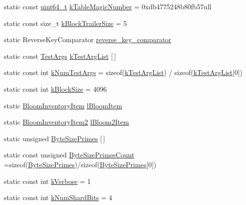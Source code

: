 \begin{DoxyCompactItemize}
\begin{tabbing}
\end{tabbing}\item 
static const \hyperlink{stdint_8h_aaa5d1cd013383c889537491c3cfd9aad}{uint64\+\_\+t} \hyperlink{namespaceleveldb_a4ea4fa6917989c12324b715f1b3069f8}{k\+Table\+Magic\+Number} = 0xdb4775248b80fb57ull
\item 
static const size\+\_\+t \hyperlink{namespaceleveldb_a4f00b102aae97cb0b0418b6f703a577e}{k\+Block\+Trailer\+Size} = 5
\item 
static Reverse\+Key\+Comparator \hyperlink{namespaceleveldb_a4f7cb0b6f4da1c10852632bfdb7dd227}{reverse\+\_\+key\+\_\+comparator}
\item 
static const \hyperlink{structleveldb_1_1_test_args}{Test\+Args} \hyperlink{namespaceleveldb_a6d7e1fb11fbc0e83ef27e87007c8a425}{k\+Test\+Arg\+List} \mbox{[}$\,$\mbox{]}
\item 
static const int \hyperlink{namespaceleveldb_a0bc857a7e9baff42f61503688957b6f5}{k\+Num\+Test\+Args} = sizeof(\hyperlink{namespaceleveldb_a6d7e1fb11fbc0e83ef27e87007c8a425}{k\+Test\+Arg\+List}) / sizeof(\hyperlink{namespaceleveldb_a6d7e1fb11fbc0e83ef27e87007c8a425}{k\+Test\+Arg\+List}\mbox{[}0\mbox{]})
\item 
static const int \hyperlink{namespaceleveldb_a6fb0b0eafa487f7c4940d210c77cece6}{k\+Block\+Size} = 4096
\item 
static \hyperlink{structleveldb_1_1_bloom_inventory_item}{Bloom\+Inventory\+Item} \hyperlink{namespaceleveldb_acc1fed1017077f7029ec84822fa65036}{l\+Bloom\+Item}
\item 
static \hyperlink{structleveldb_1_1_bloom_inventory_item2}{Bloom\+Inventory\+Item2} \hyperlink{namespaceleveldb_ae4321eb319595833c9930272feb5dde6}{l\+Bloom2\+Item}
\item 
static unsigned \hyperlink{namespaceleveldb_aba6f91cadb787d48e7534dfeaa5422be}{Byte\+Size\+Primes} \mbox{[}$\,$\mbox{]}
\item 
static const unsigned \hyperlink{namespaceleveldb_a718ea58cbfcecd6d7bddc94661756618}{Byte\+Size\+Primes\+Count} =sizeof(\hyperlink{namespaceleveldb_aba6f91cadb787d48e7534dfeaa5422be}{Byte\+Size\+Primes})/sizeof(\hyperlink{namespaceleveldb_aba6f91cadb787d48e7534dfeaa5422be}{Byte\+Size\+Primes}\mbox{[}0\mbox{]})
\item 
static const int \hyperlink{namespaceleveldb_af8897be0086c2db6e31344b7679c170a}{k\+Verbose} = 1
\item 
static const int \hyperlink{namespaceleveldb_ac3f66d6fb2271c29359e1cd233b1f8ca}{k\+Num\+Shard\+Bits} = 4
\item 

\end{DoxyCompactItemize}

